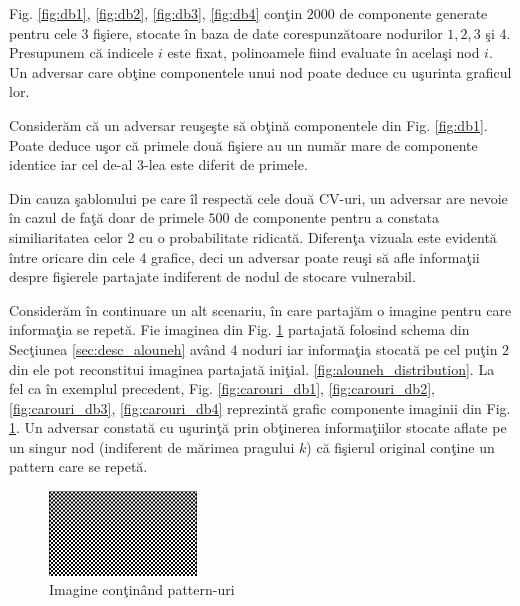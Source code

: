 \documentclass{llncs}
\begin{document}
Fig. {\ref{fig:db1}}, {\ref{fig:db2}}, {\ref{fig:db3}}, {\ref{fig:db4}} con\c{t}in $2000$ de componente generate pentru cele $3$ fi\c{s}iere, stocate \^{i}n baza de date corespunz\u{a}toare nodurilor $1,2,3$ \c{s}i $4$. Presupunem c\u{a} indicele $i$ este fixat, polinoamele fiind evaluate \^{i}n acela\c{s}i nod $i$. Un adversar care ob\c{t}ine componentele unui nod poate deduce cu u\c{s}urinta graficul lor.

Consider\u{a}m c\u{a} un adversar reu\c{s}e\c{s}te s\u{a} ob\c{t}in\u{a} componentele din Fig. {\ref{fig:db1}}. Poate deduce u\c{s}or c\u{a} primele dou\u{a} fi\c{s}iere au un num\u{a}r mare de componente identice iar cel de-al $3$-lea este diferit de primele.

Din cauza \c{s}ablonului pe care \^{i}l respect\u{a} cele dou\u{a} CV-uri, un adversar are nevoie \^{i}n cazul de fa\c{t}\u{a} doar de primele $500$ de componente pentru a constata similiaritatea celor $2$ cu o probabilitate ridicat\u{a}.
Diferen\c{t}a vizuala este evident\u{a} \^{i}ntre oricare din cele $4$ grafice, deci un adversar poate reu\c{s}i s\u{a} afle informa\c{t}ii despre fi\c{s}ierele partajate indiferent de nodul de stocare vulnerabil.

Consider\u{a}m \^{i}n continuare un alt scenariu, \^{i}n care partaj\u{a}m o imagine pentru care informa\c{t}ia se repet\u{a}. Fie imaginea din Fig. {\ref{fig:carouri}} partajat\u{a} folosind schema din Sec\c{t}iunea {\ref{sec:desc_alouneh}} av\^{a}nd $4$ noduri iar informa\c{t}ia stocat\u{a} pe cel pu\c{t}in $2$ din ele pot reconstitui imaginea partajat\u{a} ini\c{t}ial. {\ref{fig:alouneh_distribution}}. La fel ca \^{i}n exemplul precedent, Fig. {\ref{fig:carouri_db1}, \ref{fig:carouri_db2}, \ref{fig:carouri_db3}, \ref{fig:carouri_db4}} reprezint\u{a} grafic componente imaginii din Fig. {\ref{fig:carouri}}. Un adversar constat\u{a} cu u\c{s}urin\c{t}\u{a} prin ob\c{t}inerea informa\c{t}iilor stocate aflate pe un singur nod (indiferent de m\u{a}rimea pragului $k$) c\u{a} fi\c{s}ierul original con\c{t}ine un pattern care se repet\u{a}.


\begin{figure}[H]
\begin{center}
\includegraphics[width=0.35\textwidth]{img/carouri.png}    %
\caption{Imagine con\c{t}in\^{a}nd pattern-uri} 
\label{fig:carouri}
\end{center}
\end{figure}
\end{document}
